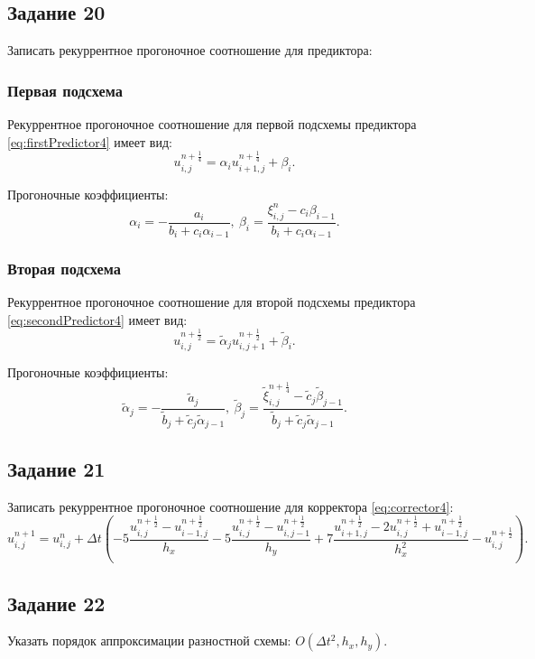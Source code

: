 \documentclass[12pt, a4paper]{report}
\begin{document}
	\subsection*{Задание 20}
	\large
	Записать рекуррентное прогоночное соотношение для предиктора:
	\subsubsection*{Первая подсхема}
	\large
	Рекуррентное прогоночное соотношение для первой подсхемы предиктора \eqref{eq:firstPredictor4} имеет вид:
	\begin{equation*}
		u_{i, j}^{n+\frac{1}{4}} = \alpha_{i}u_{i+1, j}^{n+\frac{1}{4}} + \beta_{i}.
	\end{equation*}
	\par
	Прогоночные коэффициенты:
	\begin{equation*}
		\alpha_{i} = -\frac{a_{i}}{b_{i} + c_{i}\alpha_{i-1}}, \> \beta_{i} = \frac{\xi_{i, j}^{n} - c_{i}\beta_{i-1}}{b_{i} + c_{i}\alpha_{i-1}}.
	\end{equation*}
	\subsubsection*{Вторая подсхема}
	\large
	Рекуррентное прогоночное соотношение для второй подсхемы предиктора \eqref{eq:secondPredictor4} имеет вид:
	\begin{equation*}
		u_{i, j}^{n+\frac{1}{2}} = \tilde{\alpha}_{j}u_{i, j+1}^{n+\frac{1}{2}} + \tilde{\beta}_{i}.
	\end{equation*}
	\par
	Прогоночные коэффициенты:
	\begin{equation*}
		\tilde{\alpha}_{j} = -\frac{\tilde{a}_{j}}{\tilde{b}_{j} + \tilde{c}_{j}\tilde{\alpha}_{j-1}}, \> \tilde{\beta}_{j} = \frac{\tilde{\xi}_{i, j}^{n+\frac{1}{4}} - \tilde{c}_{j}\tilde{\beta}_{j-1}}{\tilde{b}_{j} + \tilde{c}_{j}\tilde{\alpha}_{j-1}}.
	\end{equation*}

	\subsection*{Задание 21}
	\large
	Записать рекуррентное прогоночное соотношение для корректора \eqref{eq:corrector4}:
	\scriptsize
	\begin{equation*}
		u_{i, j}^{n+1} = u_{i, j}^{n} + \Delta t(-5\frac{u_{i, j}^{n+\frac{1}{2}} - u_{i-1, j}^{n+\frac{1}{2}}}{h_{x}} - 5\frac{u_{i, j}^{n+\frac{1}{2}} - u_{i, j-1}^{n+\frac{1}{2}}}{h_{y}} + 7\frac{u_{i+1, j}^{n+\frac{1}{2}} - 2u_{i, j}^{n+\frac{1}{2}} + u_{i-1, j}^{n+\frac{1}{2}}}{h_{x}^{2}} - u_{i, j}^{n+\frac{1}{2}}).
	\end{equation*}

	\subsection*{Задание 22}
	\large
	Указать порядок аппроксимации разностной схемы: $O(\Delta t^{2}, h_{x}, h_{y})$.
\end{document}
